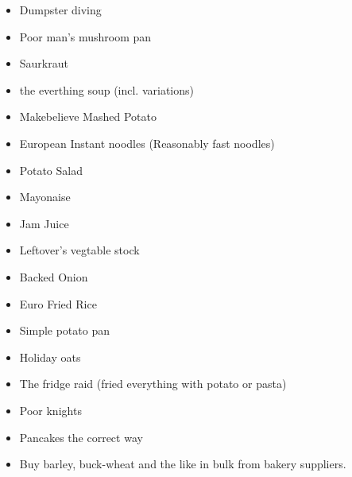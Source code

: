 \documentclass[10pt]{book}
\begin{document}
{\begin{itemize}
    \item Dumpster diving
    \item Poor man's mushroom pan
    \item Saurkraut
    \item the everthing soup (incl. variations)
    \item Makebelieve Mashed Potato
    \item European Instant noodles (Reasonably fast noodles)
    \item Potato Salad
    \item Mayonaise
    \item Jam Juice
    \item Leftover's vegtable stock
    \item Backed Onion
    \item Euro Fried Rice
    \item Simple potato pan
    \item Holiday oats
    \item The fridge raid (fried everything with potato or pasta)
    \item Poor knights
    \item Pancakes the correct way
    \item Buy barley, buck-wheat and the like in bulk from bakery suppliers.
  \end{itemize}

}
\end{document}
